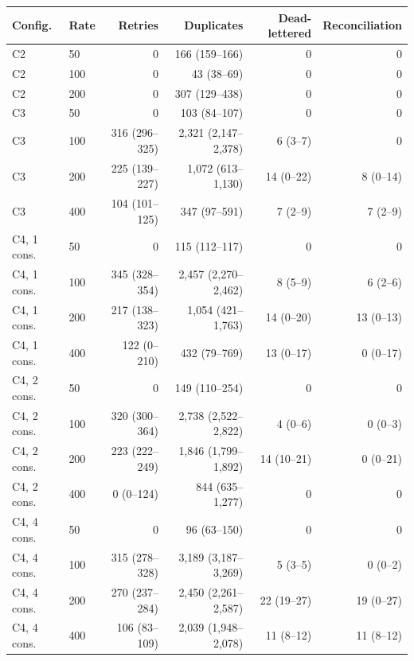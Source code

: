 \begin{tabular}{llrrrr}
\toprule
Config. & Rate & Retries & Duplicates & Dead-lettered & Reconciliation \\
\midrule
C2 & 50 & 0 & 166 (159--166) & 0 & 0 \\
C2 & 100 & 0 & 43 (38--69) & 0 & 0 \\
C2 & 200 & 0 & 307 (129--438) & 0 & 0 \\
\addlinespace[2pt]
C3 & 50 & 0 & 103 (84--107) & 0 & 0 \\
C3 & 100 & 316 (296--325) & 2,321 (2,147--2,378) & 6 (3--7) & 0 \\
C3 & 200 & 225 (139--227) & 1,072 (613--1,130) & 14 (0--22) & 8 (0--14) \\
C3 & 400 & 104 (101--125) & 347 (97--591) & 7 (2--9) & 7 (2--9) \\
\addlinespace[2pt]
C4, 1 cons. & 50 & 0 & 115 (112--117) & 0 & 0 \\
C4, 1 cons. & 100 & 345 (328--354) & 2,457 (2,270--2,462) & 8 (5--9) & 6 (2--6) \\
C4, 1 cons. & 200 & 217 (138--323) & 1,054 (421--1,763) & 14 (0--20) & 13 (0--13) \\
C4, 1 cons. & 400 & 122 (0--210) & 432 (79--769) & 13 (0--17) & 0 (0--17) \\
\addlinespace[2pt]
C4, 2 cons. & 50 & 0 & 149 (110--254) & 0 & 0 \\
C4, 2 cons. & 100 & 320 (300--364) & 2,738 (2,522--2,822) & 4 (0--6) & 0 (0--3) \\
C4, 2 cons. & 200 & 223 (222--249) & 1,846 (1,799--1,892) & 14 (10--21) & 0 (0--21) \\
C4, 2 cons. & 400 & 0 (0--124) & 844 (635--1,277) & 0 & 0 \\
\addlinespace[2pt]
C4, 4 cons. & 50 & 0 & 96 (63--150) & 0 & 0 \\
C4, 4 cons. & 100 & 315 (278--328) & 3,189 (3,187--3,269) & 5 (3--5) & 0 (0--2) \\
C4, 4 cons. & 200 & 270 (237--284) & 2,450 (2,261--2,587) & 22 (19--27) & 19 (0--27) \\
C4, 4 cons. & 400 & 106 (83--109) & 2,039 (1,948--2,078) & 11 (8--12) & 11 (8--12) \\
\bottomrule
\end{tabular}
